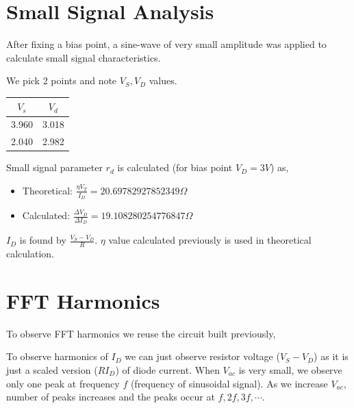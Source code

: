\documentclass[12pt,a4paper]{report}
\begin{document}
\section{Small Signal Analysis}
After fixing a bias point, a sine-wave of very small amplitude was applied to calculate small signal characteristics.
\begin{figure}[!ht]
\centering
{}%
\end{figure}
\newline We pick 2 points and note $V_S, V_D$ values.
\begin{table}[h!]
\centering
\begin{tabular}{|c|c|}
\hline
$V_s$ & $V_d$ \\
\hline
3.960 & 3.018 \\
2.040 & 2.982 \\
\hline
\end{tabular}
\end{table}
\newline Small signal parameter $r_d$ is calculated (for bias point $V_D = 3V$) as,
\begin{itemize}
    \item Theoretical: $\frac{\eta V_T}{I_D} = 20.69782927852349\Omega$
    \item Calculated: $\frac{\Delta V_D}{\Delta I_D} = 19.108280254776847\Omega$
\end{itemize}
$I_D$ is found by $\frac{V_S - V_D}{R}$. $\eta$ value calculated previously is used in theoretical calculation.
\pagebreak
\section{FFT Harmonics}
To observe FFT harmonics we reuse the circuit built previously,
\begin{figure}[!ht]
\centering
{}%
\end{figure}
\newline To observe harmonics of $I_D$ we can just observe resistor voltage ($V_S-V_D$) as it is just a scaled version ($RI_D$) of diode current. When $V_{ac}$ is very small, we observe only one peak at frequency $f$ (frequency of sinusoidal signal). As we increase $V_{ac}$, number of peaks increases and the peaks occur at $f, 2f, 3f, \cdots$.
\end{document}
